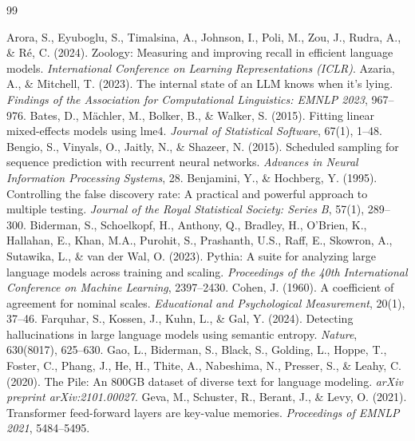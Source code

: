 \documentclass[11pt,a4paper,oneside]{report}
\begin{document}
\begin{thebibliography}{99}
\setlength{\itemsep}{2pt}\small

 Arora, S., Eyuboglu, S., Timalsina, A., Johnson, I., Poli, M., Zou, J., Rudra, A., \& R\'e, C. (2024). Zoology: Measuring and improving recall in efficient language models. \emph{International Conference on Learning Representations (ICLR)}.
 Azaria, A., \& Mitchell, T. (2023). The internal state of an LLM knows when it's lying. \emph{Findings of the Association for Computational Linguistics: EMNLP 2023}, 967--976.
 Bates, D., M\"achler, M., Bolker, B., \& Walker, S. (2015). Fitting linear mixed-effects models using lme4. \emph{Journal of Statistical Software}, 67(1), 1--48.
 Bengio, S., Vinyals, O., Jaitly, N., \& Shazeer, N. (2015). Scheduled sampling for sequence prediction with recurrent neural networks. \emph{Advances in Neural Information Processing Systems}, 28.
 Benjamini, Y., \& Hochberg, Y. (1995). Controlling the false discovery rate: A practical and powerful approach to multiple testing. \emph{Journal of the Royal Statistical Society: Series B}, 57(1), 289--300.
 Biderman, S., Schoelkopf, H., Anthony, Q., Bradley, H., O'Brien, K., Hallahan, E., Khan, M.A., Purohit, S., Prashanth, U.S., Raff, E., Skowron, A., Sutawika, L., \& van der Wal, O. (2023). Pythia: A suite for analyzing large language models across training and scaling. \emph{Proceedings of the 40th International Conference on Machine Learning}, 2397--2430.
 Cohen, J. (1960). A coefficient of agreement for nominal scales. \emph{Educational and Psychological Measurement}, 20(1), 37--46.
 Farquhar, S., Kossen, J., Kuhn, L., \& Gal, Y. (2024). Detecting hallucinations in large language models using semantic entropy. \emph{Nature}, 630(8017), 625--630.
 Gao, L., Biderman, S., Black, S., Golding, L., Hoppe, T., Foster, C., Phang, J., He, H., Thite, A., Nabeshima, N., Presser, S., \& Leahy, C. (2020). The Pile: An 800GB dataset of diverse text for language modeling. \emph{arXiv preprint arXiv:2101.00027}.
 Geva, M., Schuster, R., Berant, J., \& Levy, O. (2021). Transformer feed-forward layers are key-value memories. \emph{Proceedings of EMNLP 2021}, 5484--5495.

\end{thebibliography}
\end{document}
